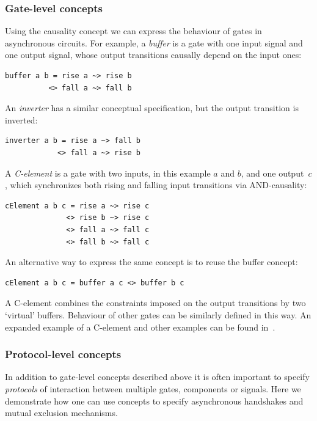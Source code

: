 \documentclass[british,conference,compsoc]{IEEEtran}
\begin{document}
\vspace{-2mm}

\subsubsection{Gate-level concepts \label{subsub:gate-level}} Using the causality concept we can express
the behaviour of gates in asynchronous circuits. For example, a \emph{buffer}
is a gate with one input signal and one output signal,
whose output transitions causally depend on the input ones:

\begin{verbatim}
buffer a b = rise a ~> rise b 
          <> fall a ~> fall b
\end{verbatim}

\noindent An \emph{inverter} has a similar conceptual specification, but the
output transition is inverted:

\begin{verbatim}
inverter a b = rise a ~> fall b
            <> fall a ~> rise b
\end{verbatim}

\noindent A \emph{C-element} is a gate with two inputs, in this example $a$ and $b$, and one
output~$c$, which synchronizes both rising and falling input transitions
via AND-causality:

\begin{verbatim}
cElement a b c = rise a ~> rise c 
              <> rise b ~> rise c
              <> fall a ~> fall c 
              <> fall b ~> fall c
\end{verbatim}

An alternative way to express the same concept is to reuse the buffer concept:

\begin{verbatim}
cElement a b c = buffer a c <> buffer b c
\end{verbatim}

A C-element combines the constraints imposed on the output
transitions by two `virtual' buffers. Behaviour of other gates can be similarly
defined in this way. An expanded example of a C-element and other examples can 
be found in~\cite{2015_Beaumont_MEMOCODE}.

\vspace{-2mm}

\subsubsection{Protocol-level concepts} In addition to gate-level concepts
described above it is often important to specify \emph{protocols}
of interaction between multiple gates, components or signals. Here we 
demonstrate how one can use concepts to specify asynchronous handshakes
and mutual exclusion mechanisms.
\end{document}

